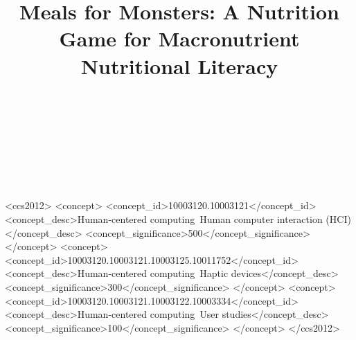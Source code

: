 \documentclass[acmlarge]{sigchi}
\begin{document}
\title{\plaintitle Meals for Monsters: A Nutrition Game for Macronutrient Nutritional Literacy}

\author{%
  \\
  \\
  \\
  \\
  \\
}

\maketitle
\begin{abstract}
    
\end{abstract}


\begin{CCSXML}
<ccs2012>
<concept>
<concept_id>10003120.10003121</concept_id>
<concept_desc>Human-centered computing~Human computer interaction (HCI)</concept_desc>
<concept_significance>500</concept_significance>
</concept>
<concept>
<concept_id>10003120.10003121.10003125.10011752</concept_id>
<concept_desc>Human-centered computing~Haptic devices</concept_desc>
<concept_significance>300</concept_significance>
</concept>
<concept>
<concept_id>10003120.10003121.10003122.10003334</concept_id>
<concept_desc>Human-centered computing~User studies</concept_desc>
<concept_significance>100</concept_significance>
</concept>
</ccs2012>
\end{CCSXML}
\end{document}
